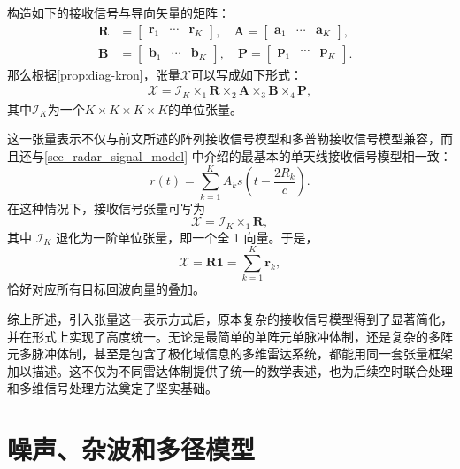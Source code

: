 构造如下的接收信号与导向矢量的矩阵：
\[
    \begin{split}
        \mathbf{R} & = \begin{bmatrix}
                           \bm{r}_1 & \cdots & \bm{r}_K
                       \end{bmatrix}, \quad
        \mathbf{A} = \begin{bmatrix}
                         \bm{a}_1 & \cdots & \bm{a}_K
                     \end{bmatrix}, \quad   \\
        \mathbf{B} & = \begin{bmatrix}
                           \bm{b}_1 & \cdots & \bm{b}_K
                       \end{bmatrix}, \quad
        \mathbf{P} = \begin{bmatrix}
                         \bm{p}_1 & \cdots & \bm{p}_K
                     \end{bmatrix}.
    \end{split}
\]
那么根据\cref{prop:diag-kron}，张量\( \mathcal{X} \)可以写成如下形式：
\[
    \begin{split}
        \mathcal{X} = \mathcal{I}_K \times_1 \mathbf{R} \times_2 \mathbf{A} \times_3 \mathbf{B} \times_4 \mathbf{P},
    \end{split}
\]
其中\( \mathcal{I}_K \)为一个\( K \times K \times K \times K \)的单位张量。

这一张量表示不仅与前文所述的阵列接收信号模型和多普勒接收信号模型兼容，而且还与\cref{sec_radar_signal_model} 中介绍的最基本的单天线接收信号模型相一致：
\[
    r(t) = \sum_{k=1}^{K} A_k s\!\left(t - \frac{2 R_k}{c}\right).
\]
在这种情况下，接收信号张量可写为
\[
    \mathcal{X} = \mathcal{I}_K \times_1 \mathbf{R},
\]
其中 \(\mathcal{I}_K\) 退化为一阶单位张量，即一个全 1 向量。于是，
\[
    \mathcal{X} = \mathbf{R}\bm{1} = \sum_{k=1}^{K} \bm{r}_k,
\]
恰好对应所有目标回波向量的叠加。

综上所述，引入张量这一表示方式后，原本复杂的接收信号模型得到了显著简化，并在形式上实现了高度统一。无论是最简单的单阵元单脉冲体制，还是复杂的多阵元多脉冲体制，甚至是包含了极化域信息的多维雷达系统，都能用同一套张量框架加以描述。这不仅为不同雷达体制提供了统一的数学表述，也为后续空时联合处理和多维信号处理方法奠定了坚实基础。

\section{噪声、杂波和多径模型}
